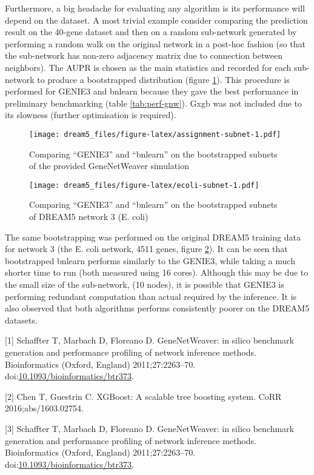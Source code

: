 \documentclass[]{article}
\theoremstyle{definition}
\theoremstyle{definition}
\theoremstyle{definition}
\theoremstyle{remark}
\begin{document}
Furthermore, a big headache for evaluating any algorithm is its
performance will depend on the dataset. A most trivial example consider
comparing the prediction result on the 40-gene dataset and then on a
random sub-network generated by performing a random walk on the original
network in a post-hoc fashion (so that the sub-network has non-zero
adjacency matrix due to connection between neighbors). The AUPR is
chosen as the main statistics and recorded for each sub-network to
produce a bootstrapped distribution (figure
\ref{fig:assignment-subnet}). This procedure is performed for GENIE3 and
bnlearn because they gave the best performance in preliminary
benchmarking (table \ref{tab:perf-gnw}). Gxgb was not included due to
its slowness (further optimisation is required).

\begin{figure}
\centering
\texttt{[image: dream5\_files/figure-latex/assignment-subnet-1.pdf]}
\caption{\label{fig:assignment-subnet}Comparing ``GENIE3'' and ``bnlearn''
on the bootstrapped subnets of the provided GeneNetWeaver simulation}
\end{figure}

\begin{figure}
\centering
\texttt{[image: dream5\_files/figure-latex/ecoli-subnet-1.pdf]}
\caption{\label{fig:ecoli-subnet}Comparing ``GENIE3'' and ``bnlearn'' on the
bootstrapped subnets of DREAM5 network 3 (E. coli)}
\end{figure}

The same bootstrapping was performed on the original DREAM5 training
data for network 3 (the E. coli network, 4511 genes, figure
\ref{fig:ecoli-subnet}). It can be seen that bootstrapped bnlearn
performs similarly to the GENIE3, while taking a much shorter time to
run (both measured using 16 cores). Although this may be due to the
small size of the sub-network, (10 nodes), it is possible that GENIE3 is
performing redundant computation than actual required by the inference.
It is also observed that both algorithms performs consistently poorer on
the DREAM5 datasets.

\hypertarget{refs}{}
\hypertarget{ref-gnw}{}
{[}1{]} Schaffter T, Marbach D, Floreano D. GeneNetWeaver: in silico
benchmark generation and performance profiling of network inference
methods. Bioinformatics (Oxford, England) 2011;27:2263--70.
doi:\href{https://doi.org/10.1093/bioinformatics/btr373}{10.1093/bioinformatics/btr373}.

\hypertarget{ref-xgboost}{}
{[}2{]} Chen T, Guestrin C. XGBoost: A scalable tree boosting system.
CoRR 2016;abs/1603.02754.

\hypertarget{ref-GENIE3}{}
{[}3{]} Schaffter T, Marbach D, Floreano D. GeneNetWeaver: in silico
benchmark generation and performance profiling of network inference
methods. Bioinformatics (Oxford, England) 2011;27:2263--70.
doi:\href{https://doi.org/10.1093/bioinformatics/btr373}{10.1093/bioinformatics/btr373}.
\end{document}
